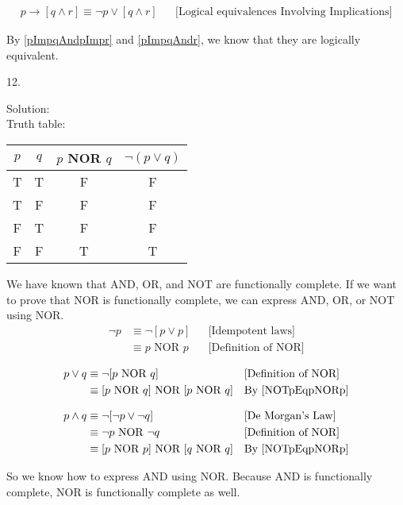 \documentclass[12pt]{article}
\begin{document}
\begin{align}
\label{pImpqAndr}
p \to [q \land r] \equiv \lnot p \lor [q\land r] && \text{[Logical equivalences Involving Implications]}
\end{align}

By \ref{pImpqAndpImpr} and \ref{pImpqAndr}, we know that they are logically equivalent.
\newpage

12. 

\indent Solution:\\
\indent Truth table:\\
\begin{center}
\begin{tabular}{c|c|c|c}
    $p$ & $q$ & $p $ NOR $ q$ & $\lnot (p \lor q)$ \\
\hline
T & T & F & F\\
T & F & F & F\\
F & T & F & F\\
F & F & T & T
\end{tabular}
\end{center}

\indent We have known that AND, OR, and NOT are functionally complete. If we want to prove that NOR is functionally complete, we can express AND, OR, or NOT using NOR.\\

\begin{align}
\lnot p & \equiv \lnot [p \lor p] && \text{[Idempotent laws]}\\
        \label{NOTpEqpNORp}
        & \equiv p \text{ NOR } p && \text{[Definition of NOR]}
\end{align}

\begin{align}
p \lor q & \equiv \lnot [p \text{ NOR } q] && \text{[Definition of NOR]} \\
         & \equiv [p \text{ NOR } q] \text{ NOR } [p \text{ NOR } q] && \text{By \ref{NOTpEqpNORp}}
\end{align}

\begin{align}
p \land q & \equiv \lnot [\lnot p \lor \lnot q] && \text{[De Morgan's Law]} \\
          & \equiv \lnot p \text{ NOR } \lnot q && \text{[Definition of NOR]}\\
          & \equiv [p \text{ NOR } p] \text{ NOR } [q \text{ NOR } q] &&       \text{By \ref{NOTpEqpNORp}} 
\end{align}

\indent So we know how to express AND using NOR. Because AND is functionally complete, NOR is functionally complete as well. \\
\end{document}
